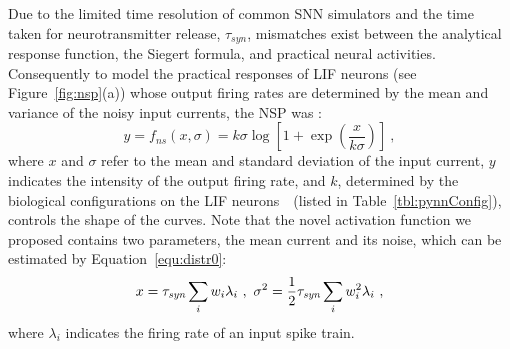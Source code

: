 %	
	Due to the limited time resolution of common SNN simulators and the time taken for neurotransmitter release, $\tau_{syn}$, mismatches exist between the analytical response function, the Siegert formula, and practical neural activities.
	Consequently to model the practical responses of LIF neurons (see Figure~\ref{fig:nsp}(a)) whose output firing rates are determined by the mean and variance of the noisy input currents, the NSP was \DIFdelbegin {}\DIFdelend \DIFaddbegin {}\DIFaddend :
	\begin{equation}
	y = f_{ns}(x, \sigma) = k \sigma \log [1 + \exp(\frac{x}{k \sigma})]~,
	\label{equ:nsp}
	\end{equation}
	where $x$ and $\sigma$ refer to the mean and standard deviation of the input current, $y$ indicates the intensity of the output firing rate, and $k$, determined by the biological configurations on the LIF neurons~\DIFdelbegin {}\DIFdelend \DIFaddbegin {}\DIFaddend ~(listed in Table~\ref{tbl:pynnConfig}), controls the shape of the curves.
	Note that the novel activation function we proposed contains two parameters, the mean current and its noise, which can be estimated by Equation~\ref{equ:distr0}:
	\begin{equation}
	x = \tau_{\textit{\textrm{syn}}}\sum_i w_i\lambda_{i}~, ~\sigma^2=\frac{1}{2}\tau_{\textit{\textrm{syn}}}\sum_i w_i^2\lambda_{i}~,
	\label{equ:distr}
	\end{equation}
	where $\lambda_i$ indicates the firing rate of an input spike train.
